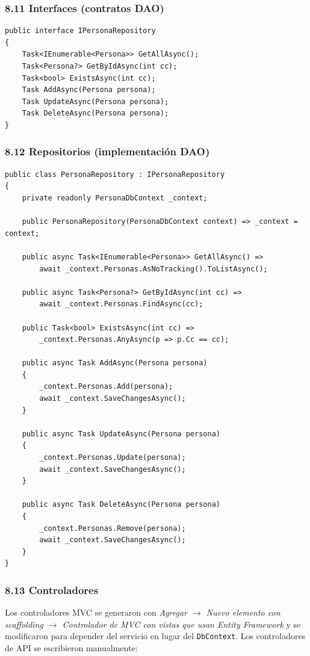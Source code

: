 \documentclass[12pt,letterpaper]{article}
\begin{document}
\subsubsection{8.11 Interfaces (contratos DAO)}
\begin{lstlisting}[language=CSharpX,caption={\texttt{Back/03-AccesoDatos/Repository/Interfaces/IPersonaRepository.cs}.}]
public interface IPersonaRepository
{
    Task<IEnumerable<Persona>> GetAllAsync();
    Task<Persona?> GetByIdAsync(int cc);
    Task<bool> ExistsAsync(int cc);
    Task AddAsync(Persona persona);
    Task UpdateAsync(Persona persona);
    Task DeleteAsync(Persona persona);
}
\end{lstlisting}

\subsubsection{8.12 Repositorios (implementación DAO)}
\begin{lstlisting}[language=CSharpX,caption={\texttt{Back/03-AccesoDatos/Repository/Implementations/PersonaRepository.cs}.}]
public class PersonaRepository : IPersonaRepository
{
    private readonly PersonaDbContext _context;

    public PersonaRepository(PersonaDbContext context) => _context = context;

    public async Task<IEnumerable<Persona>> GetAllAsync() =>
        await _context.Personas.AsNoTracking().ToListAsync();

    public async Task<Persona?> GetByIdAsync(int cc) =>
        await _context.Personas.FindAsync(cc);

    public Task<bool> ExistsAsync(int cc) =>
        _context.Personas.AnyAsync(p => p.Cc == cc);

    public async Task AddAsync(Persona persona)
    {
        _context.Personas.Add(persona);
        await _context.SaveChangesAsync();
    }

    public async Task UpdateAsync(Persona persona)
    {
        _context.Personas.Update(persona);
        await _context.SaveChangesAsync();
    }

    public async Task DeleteAsync(Persona persona)
    {
        _context.Personas.Remove(persona);
        await _context.SaveChangesAsync();
    }
}
\end{lstlisting}

\subsubsection{8.13 Controladores}
Los controladores MVC se generaron con \emph{Agregar $\rightarrow$ Nuevo elemento con
scaffolding $\rightarrow$ Controlador de MVC con vistas que usan Entity Framework} y se
modificaron para depender del servicio en lugar del \texttt{DbContext}. Los
controladores de API se escribieron manualmente:
\end{document}
